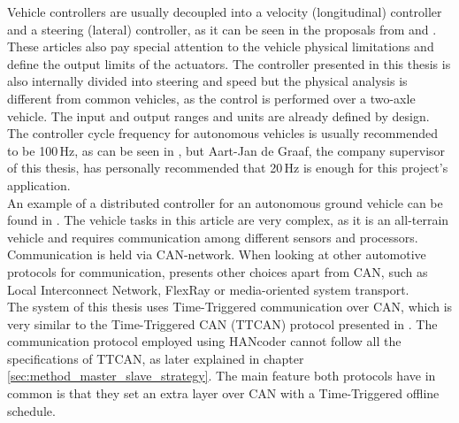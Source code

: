 \documentclass[table,xcdraw]{article}
\begin{document}
Vehicle controllers are usually decoupled into a velocity (longitudinal) controller and a steering (lateral) controller, as it can be seen in the proposals from \citep{control_strategies_auto_vehicles} and \citep{tech_review_control_aut_ground_vehicles}. These articles also pay special attention to the vehicle physical limitations and define the output limits of the actuators. The controller presented in this thesis is also internally divided into steering and speed but the physical analysis is different from common vehicles, as the control is performed over a two-axle vehicle. The input and output ranges and units are already defined by design. The controller cycle frequency for autonomous vehicles is usually recommended to be 100$\,$Hz, as can be seen in \citep{controller_arch_autonomous_vehicle}, but Aart-Jan de Graaf, the company supervisor of this thesis, has personally recommended that 20$\,$Hz is enough for this project's application.\\

An example of a distributed controller for an autonomous ground vehicle can be found in \citep{distributed_all_terrain_vehicle}. The vehicle tasks in this article are very complex, as it is an all-terrain vehicle and requires communication among different sensors and processors. Communication is held via CAN-network. When looking at other automotive protocols for communication, \citep{automotive_comm_protocols} presents other choices apart from CAN, such as Local Interconnect Network, FlexRay or media-oriented system transport.\\


The system of this thesis uses Time-Triggered communication over CAN, which is very similar to the Time-Triggered CAN (TTCAN) protocol presented in \citep{ttcan}. The communication protocol employed using HANcoder cannot follow all the specifications of TTCAN, as later explained in chapter \ref{sec:method_master_slave_strategy}. The main feature both protocols have in common is that they set an extra layer over CAN with a Time-Triggered offline schedule.\\
\end{document}
